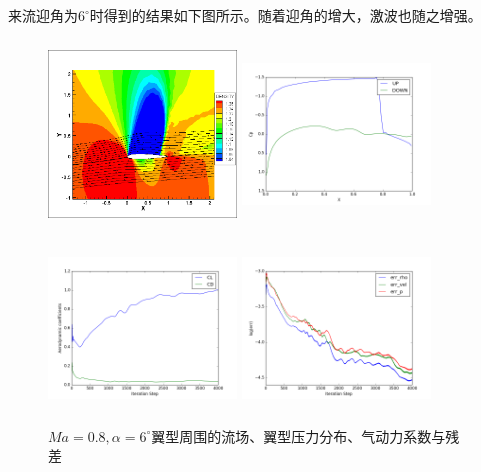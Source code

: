 \documentclass[UTF8]{ctexart}
\begin{document}
\indent 来流迎角为$6^\circ$时得到的结果如下图所示。随着迎角的增大，激波也随之增强。
\begin{figure}[H]\centering
  \begin{minipage}{5.5cm}
    \centering
    \includegraphics[height=5cm,width=5cm]{../pic/0.8_6_flowfield.png}
  \end{minipage}%
  \begin{minipage}{5.5cm}
    \centering
    \includegraphics[height=5cm,width=5cm]{../pic/0.8_6_Cp.png}
  \end{minipage}

  \begin{minipage}{5.5cm}
    \centering
    \includegraphics[height=5cm,width=5cm]{../pic/0.8_6_cl_cd.png}
  \end{minipage}%
  \begin{minipage}{5.5cm}
    \centering
    \includegraphics[height=5cm,width=5cm]{../pic/0.8_6_residual.png}
  \end{minipage}
  \caption{$Ma=0.8,\alpha=6^\circ$翼型周围的流场、翼型压力分布、气动力系数与残差}
\end{figure}
\end{document}
